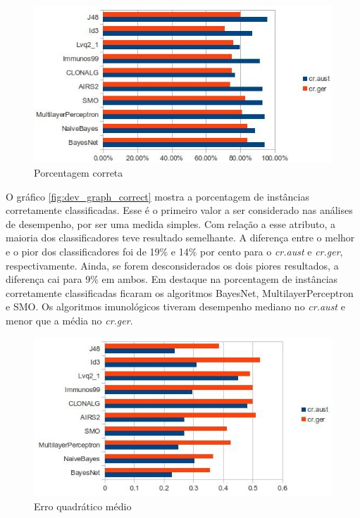 \begin{figure}[h]
    \centering
    \caption{Porcentagem correta}
    \label{fig:dev_graph_correct}
    \label{fig:dev_graph_first}
    \includegraphics[width=1\textwidth]{img/graph_perc_correct.jpg}
\end{figure}

O gráfico \ref{fig:dev_graph_correct} mostra a porcentagem de instâncias corretamente classificadas. Esse é o primeiro valor a ser considerado nas análises de desempenho, por ser uma medida simples. Com relação a esse atributo, a maioria dos classificadores teve resultado semelhante. A diferença entre o melhor e o pior dos classificadores foi de 19\% e 14\% por cento para o \emph{cr.aust} e \emph{cr.ger}, respectivamente. Ainda, se forem desconsiderados os dois piores resultados, a diferença cai para 9\% em ambos. Em destaque na porcentagem de instâncias corretamente classificadas ficaram os algoritmos BayesNet, MultilayerPerceptron e SMO. Os algoritmos imunológicos tiveram desempenho mediano no \emph{cr.aust} e menor que a média no \emph{cr.ger}.

\begin{figure}[h]
    \centering
    \caption{Erro quadrático médio}
    \label{fig:dev_graph_error}
    \includegraphics[width=1\textwidth]{img/graph_error.jpg}
\end{figure}

